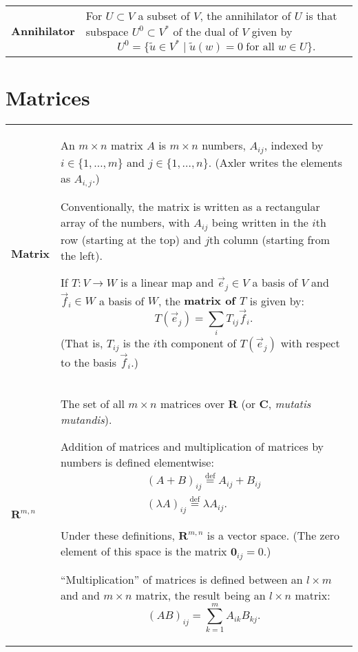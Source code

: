 \documentclass[10pt, a4paper, landscape]{article}
\newcommand{\defn}[1]{\textbf{#1}}
\newcommand{\isdef}{\stackrel{\text{def}}{=}}
\newcommand{\set}[1]{\mathbold{#1}}
\begin{document}
\begin{multicols*}{3}
\begin{tabularx}{\columnwidth}{@{}l>{\raggedright\arraybackslash}X@{}}
  \defn{Annihilator} & For $U\subset V$ a subset of $V$, the annihilator of $U$ is that subspace $U^0\subset V^*$ of the dual of $V$ given by
                       \[
                       U^0 = \{ \tilde{u}\in V^* \mid \tilde{u}(w)=0 \;\text{for all $w\in U$} \}.
                       \]
  \end{tabularx}



\section*{Matrices}
\begin{tabularx}{\columnwidth}{@{}l>{\raggedright\arraybackslash}X@{}}
  \toprule
  \defn{Matrix} & An $m\times n$ matrix $A$ is $m\times n$ numbers, $A_{ij}$, indexed by $i\in\{1,\dotsc, m\}$ and $j\in\{1,\dotsc, n\}$. (Axler writes the elements as $A_{i,j}$.)

  Conventionally, the matrix is written as a rectangular array of the
  numbers, with $A_{ij}$ being written in the $i$th row (starting at the
  top) and $j$th column (starting from the left).
  
  If $T\colon V\to W$ is a linear map and $\vec{e}_j\in V$ a basis of $V$ and $\vec{f}_i\in W$ a basis of $W$, the \defn{matrix of $T$} is given by:
  \begin{equation*}
    T(\vec{e}_j) = \sum_i T_{ij} \vec{f}_i.
  \end{equation*}
  (That is, $T_{ij}$ is the $i$th component of $T(\vec{e}_j)$ with respect to the basis $\vec{f}_i$.)
  \\
  
  $\set{R}^{m,n}$ & The set of all $m\times n$ matrices over $\set{R}$ (or $\set{C}$, \emph{mutatis mutandis}).

  Addition of matrices and multiplication of matrices by numbers is
  defined elementwise:
  \begin{equation*}
    \begin{gathered}
      (A+B)_{ij} \isdef A_{ij} + B_{ij} \\
      (\lambda A)_{ij} \isdef \lambda A_{ij}.
    \end{gathered}
  \end{equation*}

  Under these definitions, $\set{R}^{m,n}$ is a vector space. (The zero element of this space is the matrix $\mathbold{0}_{ij} = 0$.)
  
  “Multiplication” of matrices is defined between an $l\times m$ and and $m \times n$ matrix, the result being an $l\times n$ matrix:
  \begin{equation*}
    (AB)_{ij} = \sum_{k=1}^m A_{ik}B_{kj}.
  \end{equation*}
  \\
\end{tabularx}


\end{multicols*}
\end{document}
